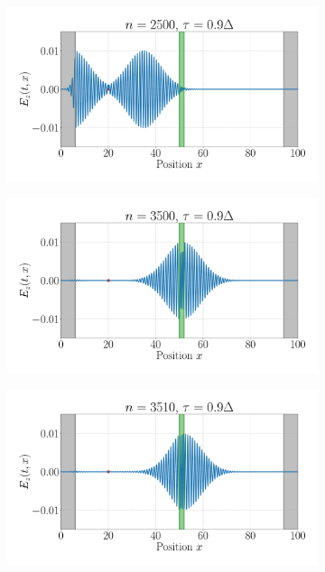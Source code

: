 \documentclass[11pt, A4paper]{article}
\begin{document}
\begin{figure}[h!]
     \begin{subfigure}[h]{0.499\textwidth}
         \centering
         \includegraphics[width=\textwidth]{Plots/maxwell_tau0.9_thinglass_nmax2500.pdf}
         \caption{}
         \label{fig: thin_t40_tau09}
     \end{subfigure}
     \begin{subfigure}[h]{0.499\textwidth}
         \centering
         \includegraphics[width=\textwidth]{Plots/maxwell_tau0.9_thinglass_nmax3500.pdf}
         \caption{}
         \label{fig: thin_t60_tau09}
     \end{subfigure}
     \begin{subfigure}[h]{0.499\textwidth}
         \centering
         \includegraphics[width=\textwidth]{Plots/maxwell_tau0.9_thinglass_nmax3510.pdf}

\end{subfigure}
\end{figure}
\end{document}
